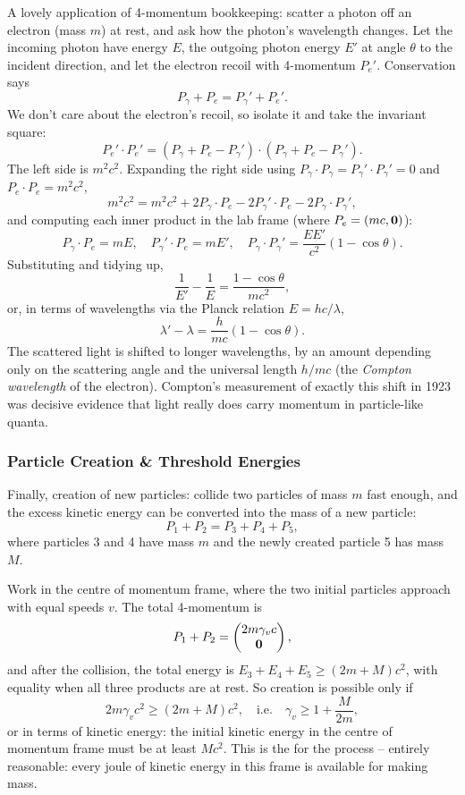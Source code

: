 \documentclass[a4paper]{scrartcl}
\begin{document}
\begin{example}
	A lovely application of 4-momentum bookkeeping: scatter a photon off an electron (mass $m$) at rest, and ask how the photon's wavelength changes. Let the incoming photon have energy $E$, the outgoing photon energy $E'$ at angle $\theta$ to the incident direction, and let the electron recoil with 4-momentum $P_e'$. Conservation says
	$$
	P_\gamma + P_e = P_\gamma' + P_e'.
	$$
	We don't care about the electron's recoil, so isolate it and take the invariant square:
	$$
	P_e' \cdot P_e' = (P_\gamma + P_e - P_\gamma') \cdot (P_\gamma + P_e - P_\gamma') .
	$$
	The left side is $m^2c^2$. Expanding the right side using $P_\gamma \cdot P_\gamma = P_\gamma' \cdot P_\gamma' = 0$ and $P_e \cdot P_e = m^2c^2$,
	$$
	m^2 c^2 = m^2c^2 + 2 P_\gamma \cdot P_e - 2 P_\gamma' \cdot P_e - 2 P_\gamma \cdot P_\gamma',
	$$
	and computing each inner product in the lab frame (where $P_e = (mc, \mathbf{0})$):
	$$
	P_\gamma \cdot P_e = mE, \quad P_\gamma' \cdot P_e = mE', \quad P_\gamma \cdot P_\gamma' = \frac{EE'}{c^2}(1 - \cos\theta).
	$$
	Substituting and tidying up,
	$$
	\frac{1}{E'} - \frac{1}{E} = \frac{1 - \cos\theta}{mc^2},
	$$
	or, in terms of wavelengths via the Planck relation $E = hc/\lambda$,
	$$
	\lambda' - \lambda = \frac{h}{mc}(1 - \cos \theta).
	$$
	The scattered light is shifted to longer wavelengths, by an amount depending only on the scattering angle and the universal length $h/mc$ (the \emph{Compton wavelength} of the electron). Compton's measurement of exactly this shift in 1923 was decisive evidence that light really does carry momentum in particle-like quanta.
\end{example}

\subsubsection{Particle Creation \& Threshold Energies}

Finally, creation of new particles: collide two particles of mass $m$ fast enough, and the excess kinetic energy can be converted into the mass of a new particle:
$$
P_1 + P_2 = P_3 + P_4 + P_5,
$$
where particles 3 and 4 have mass $m$ and the newly created particle 5 has mass $M$.

Work in the centre of momentum frame, where the two initial particles approach with equal speeds $v$. The total 4-momentum is
$$
P_1 + P_2 = \begin{pmatrix} 2m \gamma_v c \\ \mathbf{0}\end{pmatrix},
$$
and after the collision, the total energy is $E_3 + E_4 + E_5 \geq (2m + M)c^2$, with equality when all three products are at rest. So creation is possible only if
$$
2m\gamma_v c^2 \geq (2m + M)c^2, \quad \text{i.e.} \quad \gamma_v \geq 1 + \frac{M}{2m},
$$
or in terms of kinetic energy: the initial kinetic energy in the centre of momentum frame must be at least $Mc^2$. This is the  for the process -- entirely reasonable: every joule of kinetic energy in this frame is available for making mass.
\end{document}
